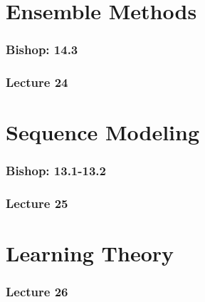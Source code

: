 \documentclass[english, 11pt]{article}
\begin{document}
\section{Ensemble Methods}
		\subsubsection{Bishop: 14.3}
		\subsubsection{Lecture 24}

\section{Sequence Modeling}
		\subsubsection{Bishop: 13.1-13.2}
		\subsubsection{Lecture 25}

\section{Learning Theory}
		\subsubsection{Lecture 26}
\end{document}
